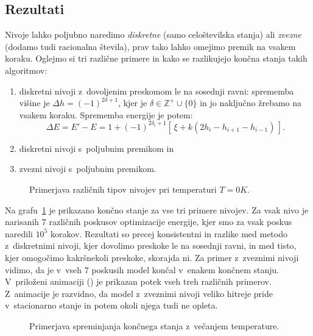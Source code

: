 \documentclass[a4paper,pdftex,10pt]{article}
\numberwithin{figure}{section} %
\begin{document}
\subsection{Rezultati}
Nivoje lahko poljubno naredimo \emph{diskretne} (samo celoštevilska stanja) ali 
\emph{zvezne} (dodamo tudi racionalna števila), prav tako lahko omejimo premik na vsakem 
koraku. Oglejmo si tri različne primere in kako se razlikujejo končna stanja takih 
algoritmov:
\begin{enumerate}
    \item diskretni nivoji z~dovoljenim preskomom le na sosednji ravni: sprememba 
	višine je $\Delta h =  (-1)^{2 \delta + 1}$, kjer je $\delta \in \mathds{Z}^+ \! 
	\cup \!  \{0\}$ in jo naključno žrebamo na vsakem koraku. Sprememba energije je 
	potem: 
	\begin{equation} 
	    \Delta E = E' - E = 1 + (-1)^{2 \delta_i + 1} \left[ \, \xi + k \left(2 h_i - 
	    h_{i+1} - h_{i-1} \right) \, \right].
	\end{equation}
    \item diskretni nivoji s~poljubnim premikom in 
    \item zvezni nivoji s~poljubnim premikom.
\end{enumerate}

\begin{figure}    
    \centering
    \resizebox{0.75\linewidth}{!}{}
    \caption{Primerjava različnih tipov nivojev pri temperaturi $T=0K$.}
    \label{slika1}
\end{figure}

Na grafu~\ref{slika1} je prikazano končno stanje za vse tri primere nivojev. Za vsak nivo
je narisanih $7$ različnih poskusov optimizacije energije, kjer smo za vsak poskus naredili 
$10^5$ korakov. Rezultati so precej konsistentni in razlike med metodo z~diskretnimi nivoji,
kjer dovolimo preskoke le na sosednji ravni, in med tisto, kjer omogočimo kakršnekoli 
preskoke, skorajda ni. Za primer z~zveznimi nivoji vidimo, da je v~vseh $7$ poskusih model
končal v~enakem končnem stanju. V~priloženi animaciji () je prikazan 
potek vseh treh različnih primerov. Z~animacije je razvidno, da model z~zveznimi nivoji
veliko hitreje pride v~stacionarno stanje in potem okoli njega tudi ne opleta.

\begin{figure}    
    \centering 
    \resizebox{0.49\linewidth}{!}{} 
    \resizebox{0.49\linewidth}{!}{} 
    \resizebox{0.49\linewidth}{!}{} 
    \caption{Primerjava spreminjanja končnega stanja z~večanjem temperature.}
    \label{slika2}
\end{figure}
\end{document}

